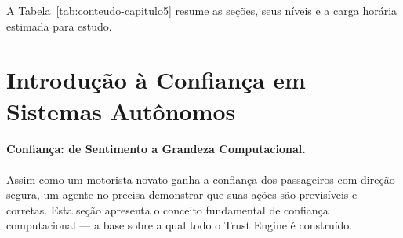A Tabela~\ref{tab:conteudo-capitulo5} resume as seções, seus níveis e a
carga horária estimada para estudo.

\begin{table}[htb]
\centering
    \small
\caption{Conteúdo do Capítulo 5}
\label{tab:conteudo-capitulo5}
\end{table}

\section{Introdução à Confiança em Sistemas Autônomos}
\label{sec:introducao-confianca}
\nivelzero

\paragraph{Confiança: de Sentimento a Grandeza Computacional.}
Assim como um motorista novato ganha a confiança dos passageiros
com direção segura, um agente no \opencodeeco{} precisa
demonstrar que suas ações são previsíveis e corretas.
Esta seção apresenta o conceito fundamental de confiança
computacional --- a base sobre a qual todo o Trust Engine é
construído.

